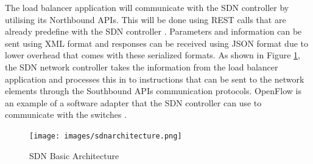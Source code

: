 \newline
\par
The load balancer application will communicate with the SDN controller by utilising its Northbound APIs. This will be done using REST calls that are already predefine with the SDN controller \cite{northbound}. Parameters and information can be sent using XML format and responses can be received using JSON format due to lower overhead that comes with these serialized formats. As shown in Figure \ref{fig:sdnarch}, the SDN network controller takes the information from the load balancer application and processes this in to instructions that can be sent to the network elements through the Southbound APIs communication protocols. OpenFlow is an example of a software adapter that the SDN controller can use to communicate with the switches \cite{southbound}.

\begin{figure}[h!]
 \centering
 \texttt{[image: images/sdnarchitecture.png]}
 \caption{SDN Basic Architecture}
 \label{fig:sdnarch}
\end{figure}

